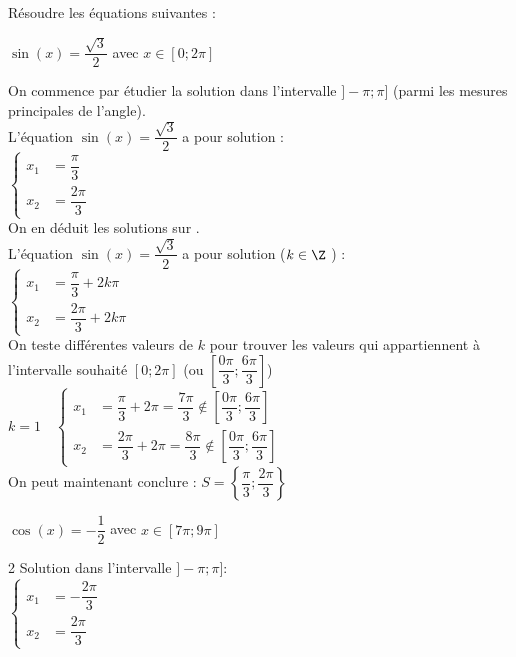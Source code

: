 \documentclass[11pt,a4paper]{article}  %
\begin{document}
Résoudre les équations suivantes : 
\begin{enumMet}
	\item {} $\sin(x)=\dfrac{\sqrt{3}}{2}$ avec $x\in \left[0;2\pi\right]$\\
	\begin{corrBox}
		On commence par étudier la solution dans l'intervalle $]-\pi;\pi]$ (parmi les mesures principales de l'angle).\\
		L'équation $\sin(x)=\dfrac{\sqrt{3}}{2}$ a pour solution :\\
		$\begin{cases}
			x_1 &=\dfrac{\pi}{3}\\
			x_2 &=\dfrac{2\pi}{3}
		\end{cases}$\\
		On en déduit les solutions sur \R.\\
		L'équation $\sin(x)=\dfrac{\sqrt{3}}{2}$ a pour solution ($k\in \Z$ ) :\\
		$\begin{cases}
			x_1 &=\dfrac{\pi}{3}+2k\pi\\
			x_2 &=\dfrac{2\pi}{3}+2k\pi\
		\end{cases}$\\
		On teste différentes valeurs de $k$ pour trouver les valeurs qui appartiennent à l'intervalle souhaité $\left[0;2\pi\right]$ (ou $\left[\dfrac{0\pi}{3};\dfrac{6\pi}{3}\right]$)\\
		$k=1\quad \begin{cases}
			x_1 &=\dfrac{\pi}{3}+2\pi=\dfrac{7\pi}{3}\notin\left[\dfrac{0\pi}{3};\dfrac{6\pi}{3}\right]\\
			x_2 &=\dfrac{2\pi}{3}+2\pi=\dfrac{8\pi}{3}\notin\left[\dfrac{0\pi}{3};\dfrac{6\pi}{3}\right]
		\end{cases}$\\
		On peut maintenant conclure : $S=\left\{\dfrac{\pi}{3};\dfrac{2\pi}{3}\right\}$
	\end{corrBox}
	\item $\cos(x)=-\dfrac{1}{2}$ avec $x\in \left[7\pi;9\pi\right]$\\
	\begin{corrBox}
		\begin{multicols}{2}
			Solution dans l'intervalle $]-\pi;\pi]$:\\
			$\begin{cases}
				x_1 &=-\dfrac{2\pi}{3}\\
				x_2 &=\dfrac{2\pi}{3}
			\end{cases}$\\
		

\end{multicols}
\end{corrBox}
\end{enumMet}
\end{document}
